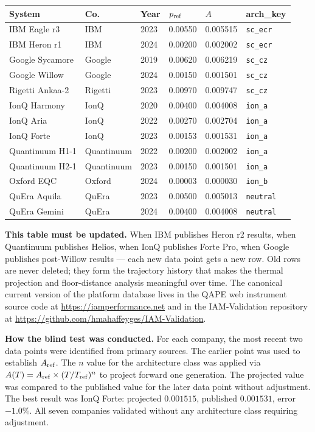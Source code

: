 \documentclass[12pt,a4paper]{article}
\begin{document}
\begin{center}
\begin{tabular}{p{3.2cm}p{1.5cm}p{1.4cm}p{1.6cm}p{1.4cm}p{1.6cm}}
\toprule
\textbf{System} & \textbf{Co.} & \textbf{Year} &
\textbf{$p_{\rm ref}$} & \textbf{$A$} & \textbf{arch\_key} \\
\midrule
IBM Eagle r3 & IBM & 2023 & 0.00550 & 0.005515 & \texttt{sc\_ecr} \\
IBM Heron r1 & IBM & 2024 & 0.00200 & 0.002002 & \texttt{sc\_ecr} \\
Google Sycamore & Google & 2019 & 0.00620 & 0.006219 & \texttt{sc\_cz} \\
Google Willow & Google & 2024 & 0.00150 & 0.001501 & \texttt{sc\_cz} \\
Rigetti Ankaa-2 & Rigetti & 2023 & 0.00970 & 0.009747 & \texttt{sc\_cz} \\
IonQ Harmony & IonQ & 2020 & 0.00400 & 0.004008 & \texttt{ion\_a} \\
IonQ Aria & IonQ & 2022 & 0.00270 & 0.002704 & \texttt{ion\_a} \\
IonQ Forte & IonQ & 2023 & 0.00153 & 0.001531 & \texttt{ion\_a} \\
Quantinuum H1-1 & Quantinuum & 2022 & 0.00200 & 0.002002 & \texttt{ion\_a} \\
Quantinuum H2-1 & Quantinuum & 2023 & 0.00150 & 0.001501 & \texttt{ion\_a} \\
Oxford EQC & Oxford & 2024 & 0.00003 & 0.000030 & \texttt{ion\_b} \\
QuEra Aquila & QuEra & 2023 & 0.00500 & 0.005013 & \texttt{neutral} \\
QuEra Gemini & QuEra & 2024 & 0.00400 & 0.004008 & \texttt{neutral} \\
\bottomrule
\end{tabular}
\end{center}

\noindent
\textbf{This table must be updated.} When IBM publishes Heron r2 results,
when Quantinuum publishes Helios, when IonQ publishes Forte Pro, when
Google publishes post-Willow results --- each new data point gets a new row.
Old rows are never deleted; they form the trajectory history that makes
the thermal projection and floor-distance analysis meaningful over time.
The canonical current version of the platform database lives in the
QAPE web instrument source code at \url{https://iamperformance.net}
and in the IAM-Validation repository at
\url{https://github.com/hmahaffeyges/IAM-Validation}.

\textbf{How the blind test was conducted.} For each company, the most
recent two data points were identified from primary sources. The earlier
point was used to establish $A_{\rm ref}$. The $n$ value for the
architecture class was applied via $A(T) = A_{\rm ref} \times
(T/T_{\rm ref})^n$ to project forward one generation. The projected
value was compared to the published value for the later data point
without adjustment. The best result was IonQ Forte: projected
$0.001515$, published $0.001531$, error $-1.0\%$. All seven companies
validated without any architecture class requiring adjustment.
\end{document}

